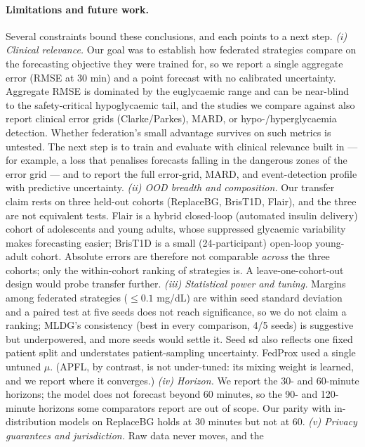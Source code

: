 \documentclass[10pt,letterpaper]{article}
\begin{document}
\paragraph{Limitations and future work.} Several constraints bound these
conclusions, and each points to a next step.
\emph{(i) Clinical relevance.} Our goal was to establish how federated
strategies compare on the forecasting objective they were trained for, so we
report a single aggregate error (RMSE at 30 min) and a point forecast with no
calibrated uncertainty. Aggregate RMSE is dominated by the euglycaemic range and
can be near-blind to the safety-critical hypoglycaemic tail, and the studies we
compare against also report clinical error grids (Clarke/Parkes), MARD, or
hypo-/hyperglycaemia detection. Whether federation's small advantage survives
on such metrics is untested. The next step is to train and evaluate with clinical
relevance built in --- for example, a loss that penalises forecasts falling in
the dangerous zones of the error grid --- and to report the full error-grid,
MARD, and event-detection profile with predictive uncertainty.
\emph{(ii) OOD breadth and composition.} Our transfer claim rests on three
held-out cohorts (ReplaceBG, BrisT1D, Flair), and the three are not equivalent
tests. Flair is a hybrid closed-loop (automated insulin delivery) cohort of
adolescents and young adults, whose suppressed glycaemic variability makes
forecasting easier; BrisT1D is a small (24-participant) open-loop young-adult
cohort. Absolute errors are therefore not comparable \emph{across} the three
cohorts; only the within-cohort ranking of strategies is. A leave-one-cohort-out
design would probe transfer further.
\emph{(iii) Statistical power and tuning.} Margins among federated strategies
($\le 0.1$ mg/dL) are within seed standard deviation and a paired test at five
seeds does not reach significance, so we do not claim a ranking; MLDG's
consistency (best in every comparison, 4/5 seeds) is suggestive but
underpowered, and more seeds would settle it. Seed sd also reflects one fixed
patient split and understates patient-sampling uncertainty. FedProx used a
single untuned $\mu$. (APFL, by contrast, is not under-tuned: its mixing weight
is learned, and we report where it converges.)
\emph{(iv) Horizon.} We report the 30- and 60-minute horizons; the model does
not forecast beyond 60 minutes, so the 90- and 120-minute horizons some
comparators report are out of scope. Our parity with in-distribution models on
ReplaceBG holds at 30 minutes but not at 60.
\emph{(v) Privacy guarantees and jurisdiction.} Raw data never moves, and the
\end{document}
